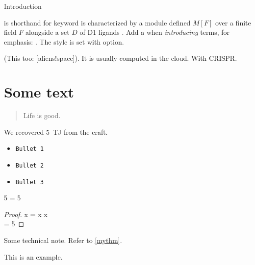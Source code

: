 
\begin{MainChapter}{Introduction}




 is shorthand for keyword
 is characterized by a module defined $M[F]$ over a finite field $F$ alongside a set $D$ of \ac{D1} ligands \cite{yolov6}.
Add a \code{*} when \emph{introducing} terms, for emphasis: .
The style is set with  option.

(This too: [aliens!space]).
It is usually computed in the cloud. With \ac{CRISPR}.

\section{Some text}

\blockcquote{johnson2022}{Life is good.}

We recovered \qty{5}{\tera\joule} from the craft.

\begin{itemize}
    \item\texttt{Bullet 1}
    \item\texttt{Bullet 2}
    \item\texttt{Bullet 3}
\end{itemize}

\begin{criterion}[label=mythm, name=Fiveness]
5 = 5
\end{criterion}

\begin{proof}
x = x \forall x\\
 = 5
\end{proof}

\begin{BoxNote}
Some technical note.
Refer to \cref{mythm}.
\end{BoxNote}

\begin{BoxExample}
This is an example.
\end{BoxExample}



\end{MainChapter}

